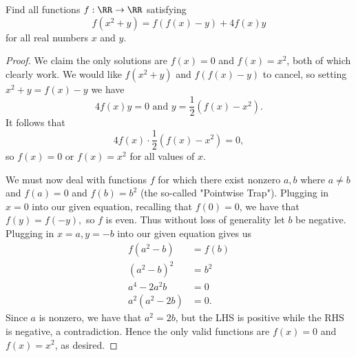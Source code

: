 \documentclass[letterpaper,oneside]{scrartcl}
\begin{document}
\newpage
\begin{problem*}
  Find all functions \(f: \RR \rightarrow \RR\) satisfying 
  \[f(x^2+y) = f(f(x)-y)+4f(x)y\]
  for all real numbers \(x\) and \(y\).
\end{problem*}
\begin{proof}
  We claim the only solutions are \(f(x)=0\) and \(f(x)=x^2\), both of which clearly work. We would like \(f(x^2+y)\) and \(f(f(x)-y)\) to cancel, so setting \(x^2+y=f(x)-y\) we have 
  \[4f(x)y = 0 \text{ and } y = \frac12\left(f(x)-x^2\right).\]
  It follows that
    \[4f(x)\cdot\frac12(f(x)-x^2) = 0,\]
  so \(f(x)=0\) or \(f(x)=x^2\) for all values of \(x\).
  
  We must now deal with functions \(f\) for which there exist nonzero \(a,b\) where \(a \neq b\) and \(f(a)=0\) and \(f(b)=b^2\) (the so-called "Pointwise Trap"). Plugging in \(x=0\) into our given equation, recalling that \(f(0)=0\), we have that \(f(y)=f(-y),\) so \(f\) is even. Thus without loss of generality let \(b\) be negative. Plugging in \(x=a, y=-b\) into our given equation gives us 
  \begin{align*}
    f(a^2-b) &= f(b) \\
    (a^2-b)^2 &= b^2 \\
    a^4-2a^2b &= 0 \\
    a^2(a^2-2b) &= 0.
  \end{align*}
  Since \(a\) is nonzero, we have that \(a^2 = 2b\), but the LHS is positive while the RHS is negative, a contradiction. Hence the only valid functions are \(f(x)=0\) and \(f(x)=x^2\), as desired.
\end{proof}
\end{document}
